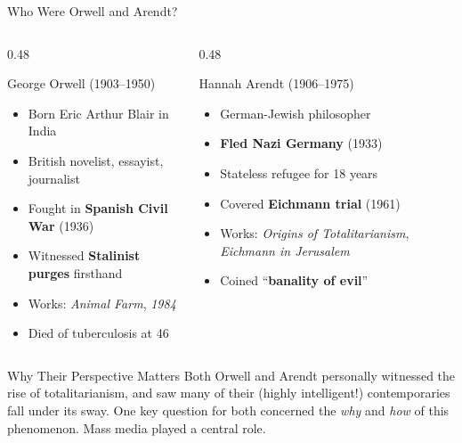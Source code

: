 \documentclass[aspectratio=169,11pt]{beamer}
\begin{document}
\begin{frame}[shrink=8]{Who Were Orwell and Arendt?}
\begin{columns}
\begin{column}{0.48\textwidth}
\begin{block}{George Orwell (1903--1950)}
\begin{itemize}
  \item Born Eric Arthur Blair in India
  \item British novelist, essayist, journalist
  \item Fought in \textbf{Spanish Civil War} (1936)
  \item Witnessed \textbf{Stalinist purges} firsthand
  \item Works: \textit{Animal Farm}, \textit{1984}
  \item Died of tuberculosis at 46
\end{itemize}
\end{block}
\end{column}

\begin{column}{0.48\textwidth}
\begin{exampleblock}{Hannah Arendt (1906--1975)}
\begin{itemize}
  \item German-Jewish philosopher
  \item \textbf{Fled Nazi Germany} (1933)
  \item Stateless refugee for 18 years
  \item Covered \textbf{Eichmann trial} (1961)
  \item Works: \textit{Origins of Totalitarianism}, \textit{Eichmann in Jerusalem}
  \item Coined ``\textbf{banality of evil}''
\end{itemize}
\end{exampleblock}
\end{column}
\end{columns}

\vspace{0.3em}
\begin{alertblock}{Why Their Perspective Matters}
Both Orwell and Arendt personally witnessed the rise of totalitarianism, and saw many of their (highly intelligent!) contemporaries fall under its sway. One key question for both concerned the \textit{why} and \textit{how} of this phenomenon. Mass media played a central role.
\end{alertblock}
\end{frame}
\end{document}
